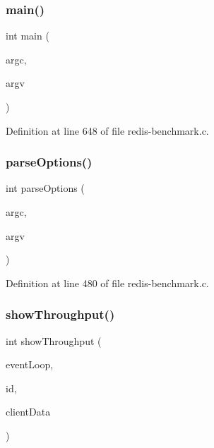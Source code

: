 \subsubsection{\texorpdfstring{main()}{main()}}
{\footnotesize\ttfamily int main (\begin{DoxyParamCaption}\item[{int}]{argc,  }\item[{const char $\ast$$\ast$}]{argv }\end{DoxyParamCaption})}



Definition at line 648 of file redis-\/benchmark.\+c.

\mbox{\label{redis-benchmark_8c_a74bf03459da77735410345bcfa169d30}} 
\subsubsection{\texorpdfstring{parse\+Options()}{parseOptions()}}
{\footnotesize\ttfamily int parse\+Options (\begin{DoxyParamCaption}\item[{int}]{argc,  }\item[{const char $\ast$$\ast$}]{argv }\end{DoxyParamCaption})}



Definition at line 480 of file redis-\/benchmark.\+c.

\mbox{\label{redis-benchmark_8c_a79aaf5a27a13ca82710e13cd81a97362}} 
\subsubsection{\texorpdfstring{show\+Throughput()}{showThroughput()}}
{\footnotesize\ttfamily int show\+Throughput (\begin{DoxyParamCaption}\item[{struct \hyperlink{structae_event_loop}{ae\+Event\+Loop} $\ast$}]{event\+Loop,  }\item[{long long}]{id,  }\item[{void $\ast$}]{client\+Data }\end{DoxyParamCaption})}



